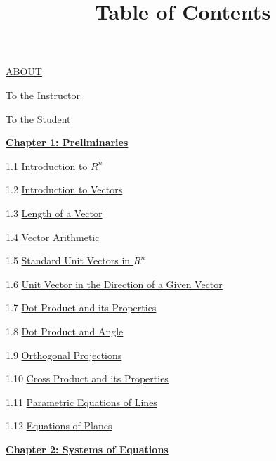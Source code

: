\documentclass{ximera}
\title{Table of Contents} \license{CC BY-NC-SA 4.0}
\begin{document}
\begin{abstract}
\end{abstract}
\maketitle
	
\href{https://ximera.osu.edu/oerlinalg/LinearAlgebra/ABOUT/main}{ABOUT}
	
\href{https://ximera.osu.edu/oerlinalg/LinearAlgebra/ABOUT/main}{To the Instructor}
	
\href{https://ximera.osu.edu/oerlinalg/LinearAlgebra/ABOUT/main}{To the Student}
	
\href{https://ximera.osu.edu/oerlinalg/LinearAlgebra/XLAChapter_prelim/main}{\textbf{Chapter 1: Preliminaries}}
	
1.1	\href{https://ximera.osu.edu/oerlinalg/LinearAlgebra/RRN-0010/main}{Introduction to $R^n$}
	
1.2	\href{https://ximera.osu.edu/oerlinalg/LinearAlgebra/VEC-0010/main}{Introduction to Vectors}
	
1.3	\href{https://ximera.osu.edu/oerlinalg/LinearAlgebra/VEC-0020/main}{Length of a Vector}
	
1.4	\href{https://ximera.osu.edu/oerlinalg/LinearAlgebra/VEC-0030/main}{Vector Arithmetic}
	
1.5	\href{https://ximera.osu.edu/oerlinalg/LinearAlgebra/VEC-0035/main}{Standard Unit Vectors in $R^n$}
	
1.6	\href{https://ximera.osu.edu/oerlinalg/LinearAlgebra/VEC-0036/main}{Unit Vector in the Direction of a Given Vector}
	
1.7	\href{https://ximera.osu.edu/oerlinalg/LinearAlgebra/VEC-0050/main}{Dot Product and its Properties}
	
1.8	\href{https://ximera.osu.edu/oerlinalg/LinearAlgebra/VEC-0060/main}{Dot Product and Angle }
	
1.9	\href{https://ximera.osu.edu/oerlinalg/LinearAlgebra/VEC-0070/main}{Orthogonal Projections}
	
1.10	\href{https://ximera.osu.edu/oerlinalg/LinearAlgebra/VEC-0080/main}{Cross Product and its Properties}
	
1.11	\href{https://ximera.osu.edu/oerlinalg/LinearAlgebra/RRN-0020/main}{Parametric Equations of Lines}
	
1.12	\href{https://ximera.osu.edu/oerlinalg/LinearAlgebra/RRN-0030/main}{Equations of Planes}
	
\href{https://ximera.osu.edu/oerlinalg/LinearAlgebra/XLAChapter_systems/main}{\textbf{Chapter 2: Systems of Equations}}
	
\end{document}
